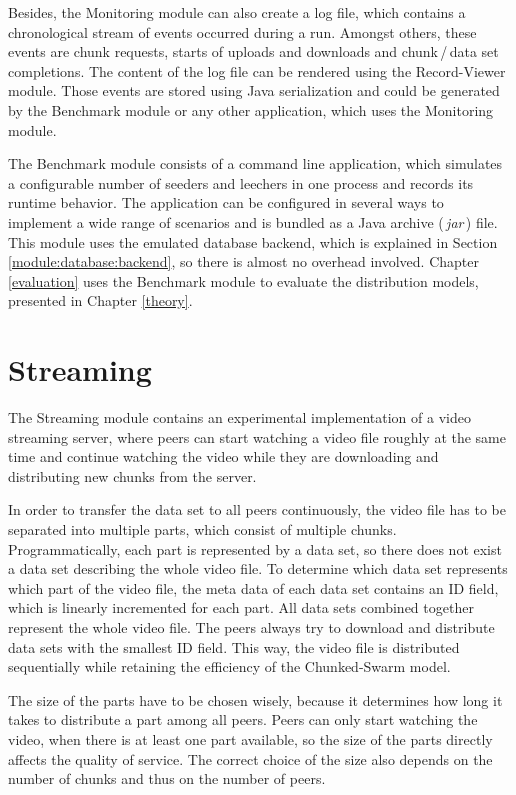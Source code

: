 Besides, the Monitoring module can also create a log file, which contains a chronological stream of events occurred during a run. Amongst others, these events are chunk requests, starts of uploads and downloads and chunk\,/\,data set completions. The content of the log file can be rendered using the Record-Viewer module. Those events are stored using Java serialization and could be generated by the Benchmark module or any other application, which uses the Monitoring module.

The Benchmark module consists of a command line application, which simulates a configurable number of seeders and leechers in one process and records its runtime behavior. The application can be configured in several ways to implement a wide range of scenarios and is bundled as a Java archive (\,\emph{jar}\,) file. This module uses the emulated database backend, which is explained in Section \ref{module:database:backend}, so there is almost no overhead involved. Chapter \ref{evaluation} uses the Benchmark module to evaluate the distribution models, presented in Chapter \ref{theory}.


\section{Streaming}
\label{module:streaming}

The Streaming module contains an experimental implementation of a video streaming server, where peers can start watching a video file roughly at the same time and continue watching the video while they are downloading and distributing new chunks from the server. 

In order to transfer the data set to all peers continuously, the video file has to be separated into multiple parts, which consist of multiple chunks. Programmatically, each part is represented by a data set, so there does not exist a data set describing the whole video file. To determine which data set represents which part of the video file, the meta data of each data set contains an ID field, which is linearly incremented for each part. All data sets combined together represent the whole video file. The peers always try to download and distribute data sets with the smallest ID field. This way, the video file is distributed sequentially while retaining the efficiency of the Chunked-Swarm model.

The size of the parts have to be chosen wisely, because it determines how long it takes to distribute a part among all peers. Peers can only start watching the video, when there is at least one part available, so the size of the parts directly affects the quality of service. The correct choice of the size also depends on the number of chunks and thus on the number of peers.

